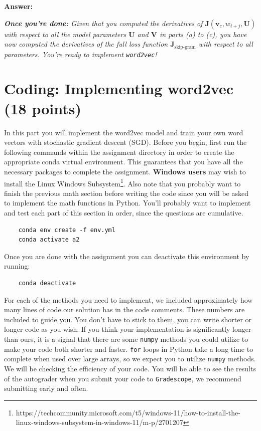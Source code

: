 \documentclass{article}
\newenvironment{answer}{
    {\bf Answer:} \sf \begingroup\color{red}
}{\endgroup}%
\begin{document}
\begin{enumerate}[label=(\alph*)]
\begin{shaded}
\begin{answer}

\end{answer}
\end{shaded}

\textit{\textbf{Once you're done:} Given that you computed the derivatives of $\bm J(\bm v_c, w_{t+j}, \bm U)$ with respect to all the model parameters $\bm U$ and $\bm V$ in parts (a) to (c), you have now computed the derivatives of the full loss function $\bm J_{\text{skip-gram}}$ with respect to all parameters. You're ready to implement \texttt{word2vec}!} %

\end{enumerate}

\section{Coding: Implementing word2vec (18 points)}
In this part you will implement the word2vec model and train your own word vectors with stochastic gradient descent (SGD). Before you begin, first run the following commands within the assignment directory in order to create the appropriate conda virtual environment. This guarantees that you have all the necessary packages to complete the assignment. \textbf{Windows users} may wish to install the Linux Windows Subsystem\footnote{https://techcommunity.microsoft.com/t5/windows-11/how-to-install-the-linux-windows-subsystem-in-windows-11/m-p/2701207}. Also note that you probably want to finish the previous math section before writing the code since you will be asked to implement the math functions in Python. You’ll probably want to implement and test each part of this section in order, since the questions are cumulative.

\begin{verbatim}
    conda env create -f env.yml
    conda activate a2
\end{verbatim}

Once you are done with the assignment you can deactivate this environment by running:
\begin{verbatim}
    conda deactivate
\end{verbatim}

For each of the methods you need to implement, we included approximately how many lines of code our solution has in the code comments. These numbers are included to guide you. You don't have to stick to them, you can write shorter or longer code as you wish. If you think your implementation is significantly longer than ours, it is a signal that there are some \texttt{numpy} methods you could utilize to make your code both shorter and faster. \texttt{for} loops in Python take a long time to complete when used over large arrays, so we expect you to utilize \texttt{numpy} methods. We will be checking the efficiency of your code. You will be able to see the results of the autograder when you submit your code to \texttt{Gradescope}, we recommend submitting early and often.
\end{document}
